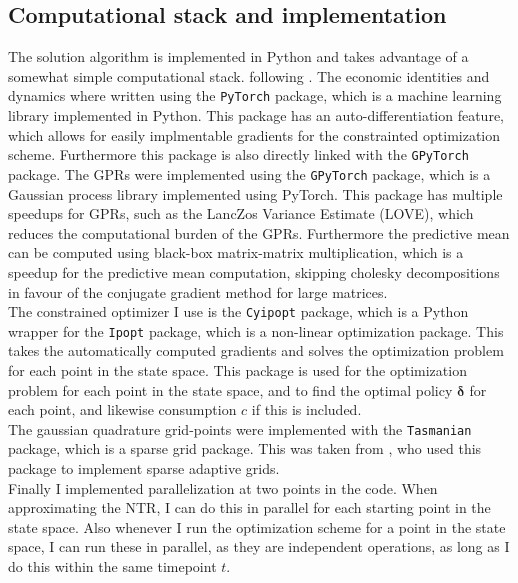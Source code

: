\documentclass[11pt]{article}
\begin{document}
\subsection{Computational stack and implementation} \label{Subsection: Computational_stack}
The solution algorithm is implemented in Python and takes advantage of a somewhat simple computational stack. following \autocite{Scheidegger2023}.
The economic identities and dynamics where written using the \texttt{PyTorch} package, which is a machine learning library implemented in Python.
This package has an auto-differentiation feature, which allows for easily implmentable gradients for the constrainted optimization scheme.
Furthermore this package is also directly linked with the \texttt{GPyTorch} package.
The \ac{GPR}s were implemented using the \texttt{GPyTorch} package, which is a Gaussian process library implemented using PyTorch.
This package has multiple speedups for \ac{GPR}s, such as the LancZos Variance Estimate (LOVE), which reduces the computational burden of the \ac{GPR}s.
Furthermore the predictive mean can be computed using black-box matrix-matrix multiplication, which is a speedup for the predictive mean computation,
skipping cholesky decompositions in favour of the conjugate gradient method for large matrices.\\
The constrained optimizer I use is the \texttt{Cyipopt} package, which is a Python wrapper for the \texttt{Ipopt} package, which is a non-linear optimization package.
This takes the automatically computed gradients and solves the optimization problem for each point in the state space.
This package is used for the optimization problem for each point in the state space, and to find the optimal policy $\boldsymbol{\delta}$ for each point, and likewise consumption $c$ if this is included.\\
The gaussian quadrature grid-points were implemented with the \texttt{Tasmanian} package, which is a sparse grid package.
This was taken from \autocite{Schober2022}, who used this package to implement sparse adaptive grids.\\
Finally I implemented parallelization at two points in the code. 
When approximating the \ac{NTR}, I can do this in parallel for each starting point in the state space.
Also whenever I run the optimization scheme for a point in the state space, I can run these in parallel,
as they are independent operations, as long as I do this within the same timepoint $t$.
\end{document}
